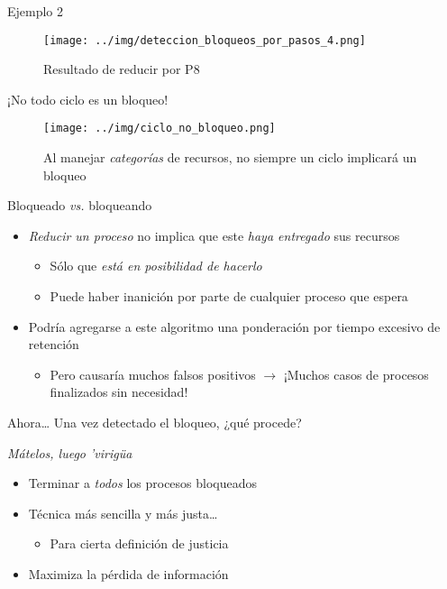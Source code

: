 \documentclass[presentation]{beamer}
\begin{document}
\begin{frame}[label={sec:org778bd33}]{Ejemplo 2}
\begin{figure}[htbp]
\centering
\texttt{[image: ../img/deteccion\_bloqueos\_por\_pasos\_4.png]}
\caption{Resultado de reducir por P8}
\end{figure}
\end{frame}

\begin{frame}[label={sec:org6242e3d}]{¡No todo ciclo es un bloqueo!}
\begin{figure}[htbp]
\centering
\texttt{[image: ../img/ciclo\_no\_bloqueo.png]}
\caption{Al manejar \emph{categorías} de recursos, no siempre un ciclo implicará un bloqueo}
\end{figure}
\end{frame}

\begin{frame}[label={sec:org1c2161b}]{Bloqueado \emph{vs.} bloqueando}
\begin{itemize}
\item \emph{Reducir un proceso} no implica que este \emph{haya entregado} sus recursos
\begin{itemize}
\item Sólo que \emph{está en posibilidad de hacerlo}
\item Puede haber inanición por parte de cualquier proceso que espera
\end{itemize}
\item Podría agregarse a este algoritmo una ponderación por tiempo
excesivo de retención
\begin{itemize}
\item Pero causaría muchos falsos positivos \(\rightarrow\) ¡Muchos casos de
procesos finalizados sin necesidad!
\end{itemize}
\end{itemize}

\begin{center}
Ahora\ldots{} Una vez detectado el bloqueo, ¿qué procede?
\end{center}
\end{frame}

\begin{frame}[label={sec:org14ee54f}]{\emph{Mátelos, luego 'virigüa}}
\begin{itemize}
\item Terminar a \emph{todos} los procesos bloqueados
\item Técnica más sencilla y más justa\ldots{}
\begin{itemize}
\item Para cierta definición de justicia
\end{itemize}
\item Maximiza la pérdida de información
\end{itemize}
\end{frame}
\end{document}
